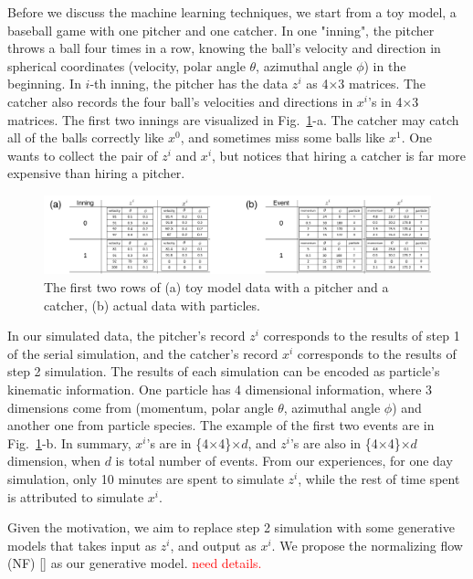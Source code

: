 \documentclass{article}
\begin{document}
\quad Before we discuss the machine learning techniques, we start from a toy model, a baseball game with one pitcher and one catcher. In one "inning", the pitcher throws a ball four times in a row, knowing the ball's velocity and direction in spherical coordinates (velocity, polar angle $\theta$, azimuthal angle $\phi$) in the beginning. In $i$-th inning, the pitcher has the data $z^{i}$ as 4$\times$3 matrices. The catcher also records the four ball's velocities and directions in $x^{i}$'s in 4$\times$3 matrices. The first two innings are visualized in Fig.~\ref{data}-a. The catcher may catch all of the balls correctly like $x^0$, and sometimes miss some balls like $x^1$. One wants to collect the pair of $z^i$ and $x^i$, but notices that hiring a catcher is far more expensive than hiring a pitcher.

\begin{figure}[!hb]
 \centering
   \includegraphics[width=\linewidth]{dataDescription.pdf}
  \caption{The first two rows of (a) toy model data with a pitcher and a catcher, (b) actual data with particles.}
  \label{data}
\end{figure}

\quad In our simulated data, the pitcher's record $z^i$ corresponds to the results of step 1 of the serial simulation, and the catcher's record $x^i$ corresponds to the results of step 2 simulation. The results of each simulation can be encoded as particle's kinematic information. One particle has 4 dimensional information, where 3 dimensions come from (momentum, polar angle $\theta$, azimuthal angle $\phi$) and another one from particle species. The example of the first two events are in Fig.~\ref{data}-b. In summary, $x^i$'s are in \{4$\times$4\}$\times d$, and $z^i$'s are also in \{4$\times$4\}$\times d$ dimension, when $d$ is total number of events. From our experiences, for one day simulation, only 10 minutes are spent to simulate $z^i$, while the rest of time spent is attributed to simulate $x^i$.

\quad Given the motivation, we aim to replace step 2 simulation with some generative models that takes input as $z^i$, and output as $x^i$. We propose the normalizing flow (NF) [\citet{9089305, papamakarios2019normalizing}] as our generative model. \textcolor{red}{need details.}
\end{document}

